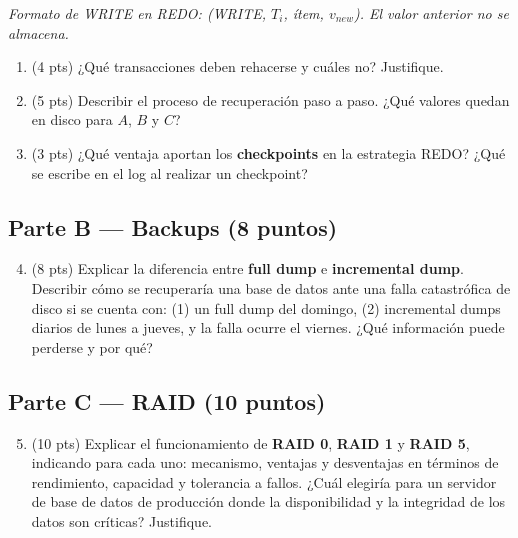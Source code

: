 \documentclass[11pt,a4paper]{article}
\begin{document}
\noindent\small\textit{Formato de WRITE en REDO: (WRITE, $T_i$, ítem, $v_{new}$). El valor anterior no se almacena.}

\normalsize
\begin{enumerate}
  \item (4 pts) ¿Qué transacciones deben rehacerse y cuáles no? Justifique.

  \vspace{2.5cm}

  \item (5 pts) Describir el proceso de recuperación paso a paso. ¿Qué valores quedan en disco para $A$, $B$ y $C$?

  \vspace{3.5cm}

  \item (3 pts) ¿Qué ventaja aportan los \textbf{checkpoints} en la estrategia REDO? ¿Qué se escribe en el log al realizar un checkpoint?

  \vspace{2.5cm}
\end{enumerate}

\subsection*{Parte B — Backups (8 puntos)}

\begin{enumerate}
  \setcounter{enumi}{3}
  \item (8 pts) Explicar la diferencia entre \textbf{full dump} e \textbf{incremental dump}. Describir cómo se recuperaría una base de datos ante una falla catastrófica de disco si se cuenta con: (1) un full dump del domingo, (2) incremental dumps diarios de lunes a jueves, y la falla ocurre el viernes. ¿Qué información puede perderse y por qué?

  \vspace{5cm}
\end{enumerate}

\subsection*{Parte C — RAID (10 puntos)}

\begin{enumerate}
  \setcounter{enumi}{4}
  \item (10 pts) Explicar el funcionamiento de \textbf{RAID 0}, \textbf{RAID 1} y \textbf{RAID 5}, indicando para cada uno: mecanismo, ventajas y desventajas en términos de rendimiento, capacidad y tolerancia a fallos. ¿Cuál elegiría para un servidor de base de datos de producción donde la disponibilidad y la integridad de los datos son críticas? Justifique.

  \vspace{7cm}
\end{enumerate}
\end{document}
